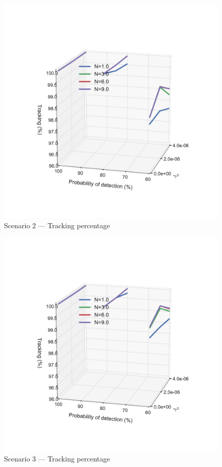 {\begin{figure}
\includegraphics[height = .46\textheight]{Figures/plots/Scenario2_Tracking-TrackingPercentage.pdf}
\caption{Scenario 2 --- Tracking percentage}\label{fig:scenario2_tracking_percentage}
\end{figure}

\begin{figure}
\centering
\includegraphics[height = .46\textheight]{Figures/plots/Scenario3_Tracking-TrackingPercentage.pdf}
\caption{Scenario 3 --- Tracking percentage}\label{fig:scenario3_tracking_percentage}


\end{figure}}
